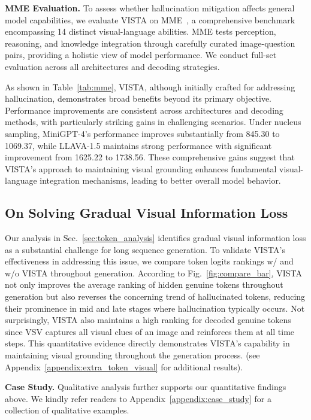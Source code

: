 \documentclass{article}
\newcommand{\ours}{{VISTA}\xspace}
\theoremstyle{plain}
\theoremstyle{definition}
\theoremstyle{remark}
\begin{document}
\textbf{MME Evaluation.}
To assess whether hallucination mitigation affects general model capabilities, we evaluate VISTA on MME~\cite{fu2023mme}, a comprehensive benchmark encompassing 14 distinct visual-language abilities. MME tests perception, reasoning, and knowledge integration through carefully curated image-question pairs, providing a holistic view of model performance. We conduct full-set evaluation across all architectures and decoding strategies.

As shown in Table~\ref{tab:mme}, VISTA, although initially crafted for addressing hallucination, demonstrates broad benefits beyond its primary objective. Performance improvements are consistent across architectures and decoding methods, with particularly striking gains in challenging scenarios. Under nucleus sampling, MiniGPT-4's performance improves substantially from 845.30 to 1069.37, while LLAVA-1.5 maintains strong performance with significant improvement from 1625.22 to 1738.56. These comprehensive gains suggest that VISTA's approach to maintaining visual grounding enhances fundamental visual-language integration mechanisms, leading to better overall model behavior.

\subsection{On Solving Gradual Visual Information Loss}\label{sec:analysis}
Our analysis in Sec.~\ref{sec:token_analysis} identifies gradual visual information loss as a substantial challenge for long sequence generation. To validate VISTA's effectiveness in addressing this issue, we compare token logits rankings w/ and w/o \ours throughout generation. According to Fig.~\ref{fig:compare_bar}, \ours not only improves the average ranking of hidden genuine tokens throughout generation but also reverses the concerning trend of hallucinated tokens, reducing their prominence in mid and late stages where hallucination typically occurs. 
Not surprisingly, \ours also maintains a high ranking for decoded genuine tokens since VSV captures all visual clues of an image and reinforces them at all time steps. This quantitative evidence directly demonstrates VISTA's capability in maintaining visual grounding throughout the generation process. (see Appendix~\ref{appendix:extra_token_visual} for additional results).

\textbf{Case Study.} Qualitative analysis further supports our quantitative findings above. We kindly refer readers to Appendix~\ref{appendix:case_study} for a collection of qualitative examples.
\end{document}
